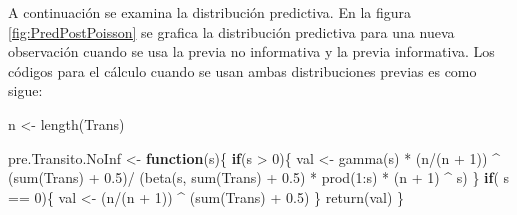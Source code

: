 \documentclass[
  10pt,
  spanish,
]{book}
\newenvironment{Shaded}{\begin{snugshade}}{\end{snugshade}}
\newcommand{\ControlFlowTok}[1]{\textcolor[rgb]{0.13,0.29,0.53}{\textbf{#1}}}
\newcommand{\DecValTok}[1]{\textcolor[rgb]{0.00,0.00,0.81}{#1}}
\newcommand{\FloatTok}[1]{\textcolor[rgb]{0.00,0.00,0.81}{#1}}
\newcommand{\FunctionTok}[1]{\textcolor[rgb]{0.00,0.00,0.00}{#1}}
\newcommand{\NormalTok}[1]{#1}
\newcommand{\OtherTok}[1]{\textcolor[rgb]{0.56,0.35,0.01}{#1}}
\newcommand{\SpecialCharTok}[1]{\textcolor[rgb]{0.00,0.00,0.00}{#1}}
\theoremstyle{definition}
\theoremstyle{definition}
\theoremstyle{definition}
\theoremstyle{definition}
\theoremstyle{remark}
\begin{document}
A continuación se examina la distribución predictiva. En la figura \ref{fig:PredPostPoisson} se grafica la distribución predictiva para una nueva observación cuando se usa la previa no informativa y la previa informativa. Los códigos para el cálculo cuando se usan ambas distribuciones previas es como sigue:

\begin{Shaded}
\begin{Highlighting}[]
\NormalTok{n }\OtherTok{\textless{}{-}} \FunctionTok{length}\NormalTok{(Trans)}

\NormalTok{pre.Transito.NoInf }\OtherTok{\textless{}{-}} \ControlFlowTok{function}\NormalTok{(s)\{}
  \ControlFlowTok{if}\NormalTok{(s }\SpecialCharTok{\textgreater{}} \DecValTok{0}\NormalTok{)\{}
\NormalTok{    val }\OtherTok{\textless{}{-}} \FunctionTok{gamma}\NormalTok{(s) }\SpecialCharTok{*} 
\NormalTok{      (n}\SpecialCharTok{/}\NormalTok{(n }\SpecialCharTok{+} \DecValTok{1}\NormalTok{)) }\SpecialCharTok{\^{}}\NormalTok{ (}\FunctionTok{sum}\NormalTok{(Trans) }\SpecialCharTok{+} \FloatTok{0.5}\NormalTok{)}\SpecialCharTok{/}
\NormalTok{      (}\FunctionTok{beta}\NormalTok{(s, }\FunctionTok{sum}\NormalTok{(Trans) }\SpecialCharTok{+} \FloatTok{0.5}\NormalTok{) }\SpecialCharTok{*} 
         \FunctionTok{prod}\NormalTok{(}\DecValTok{1}\SpecialCharTok{:}\NormalTok{s) }\SpecialCharTok{*}\NormalTok{ (n }\SpecialCharTok{+} \DecValTok{1}\NormalTok{) }\SpecialCharTok{\^{}}\NormalTok{ s)}
\NormalTok{  \}}
  \ControlFlowTok{if}\NormalTok{( s }\SpecialCharTok{==} \DecValTok{0}\NormalTok{)\{}
\NormalTok{    val }\OtherTok{\textless{}{-}}\NormalTok{ (n}\SpecialCharTok{/}\NormalTok{(n }\SpecialCharTok{+} \DecValTok{1}\NormalTok{)) }\SpecialCharTok{\^{}}\NormalTok{ (}\FunctionTok{sum}\NormalTok{(Trans) }\SpecialCharTok{+} \FloatTok{0.5}\NormalTok{)}
\NormalTok{  \}}
  \FunctionTok{return}\NormalTok{(val)}
\NormalTok{\}}


\end{Highlighting}
\end{Shaded}
\end{document}
